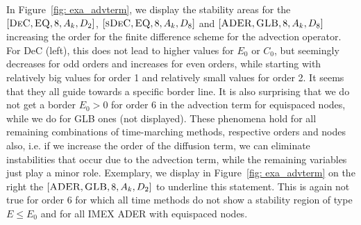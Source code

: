 In Figure~\ref{fig: exa_advterm}, we display the stability areas for the $[\textsc{DeC},\textsc{EQ},8, A_k,D_2]$, $[\textsc{sDeC},\textsc{EQ},8, A_k,D_8]$ and $[\textsc{ADER},\textsc{GLB},8, A_k,D_8]$ increasing the order for the finite difference scheme for the advection operator. 
For DeC (left), this does not lead to higher values for $E_0$ or $C_0$, but seemingly decreases for odd orders and increases for even orders, while starting with relatively big values for order 1 and relatively small values for order 2. 
It seems that they all guide towards a specific border line. It is also surprising that  we do not get a border $E_0>0$ for order 6 in the advection term for equispaced nodes, while we do for GLB ones (not displayed). 
These phenomena hold for all remaining combinations of time-marching methods, respective orders and nodes also, i.e. if we increase the order of the diffusion term, we can eliminate instabilities that occur due to the advection term, while the remaining variables just play a minor role. 
Exemplary, we display in Figure~\ref{fig: exa_advterm} on the right the $[\textsc{ADER},\textsc{GLB},8, A_k,D_2]$  to underline this statement. 
This is again not true for order 6 for which all time methods do not show a stability region of type $E\leq E_0$ and for all IMEX ADER with equispaced nodes.

